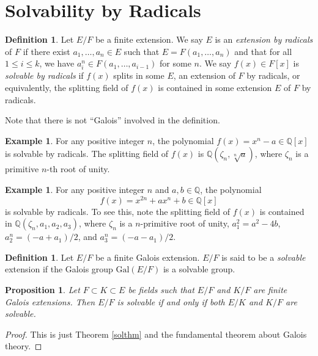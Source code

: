 \documentclass[12pt]{report}
\newtheorem{proposition}[theorem]{Proposition}
{\theoremstyle{remark}\newtheorem*{remark}{Remark}}
\theoremstyle{definition}
\newtheorem{definition}[theorem]{Definition}
\newtheorem{example}[theorem]{Example}
\newcommand{\gal}{\text{Gal}}
\newcommand{\qq}{\mathbb{Q}}
\begin{document}
\section{Solvability by Radicals}

\begin{definition}
	Let $E/F$ be a finite extension. We say $E$ is an \emph{extension by radicals} of $F$ if there exist $a_1,\dots,a_n\in E$ such that $E=F(a_1,\dots,a_n)$ and that for all $1\leq i\leq k$, we have $a_i^n\in F(a_1,\dots,a_{i-1})$ for some $n$. We say $f(x)\in F[x]$ is \emph{solvable by radicals} if $f(x)$ splits in some $E$, an extension of $F$ by radicals, or equivalently, the splitting field of $f(x)$ is contained in some extension $E$ of $F$ by radicals.
\end{definition}

Note that there is not ``Galois'' involved in the definition.

\begin{example}
	For any positive integer $n$, the polynomial $f(x)=x^n-a\in \qq[x]$ is solvable by radicals. The splitting field of $f(x)$ is $\qq(\zeta_n, \sqrt[n]{a})$, where $\zeta_n$ is a primitive $n$-th root of unity.
\end{example}

\begin{example}
	For any positive integer $n$ and $a,b\in \qq$, the polynomial $$f(x)=x^{2n}+ax^n+b\in \qq[x]$$ is solvable by radicals. To see this, note the splitting field of $f(x)$ is contained in $\qq(\zeta_n,a_1,a_2,a_3)$, where $\zeta_n$ is a $n$-primitive root of unity, $a_1^2=a^2-4b$, $a_2^n=(-a+a_1)/2$, and $a_3^n=(-a-a_1)/2$.
\end{example}

\begin{definition}
	Let $E/F$ be a finite Galois extension. $E/F$ is said to be a \emph{solvable} extension if the Galois group $\gal(E/F)$ is a solvable group.
\end{definition}

\begin{proposition}\label{subsol}
	Let $F\subset K\subset E$ be fields such that $E/F$ and $K/F$ are finite Galois extensions. Then $E/F$ is solvable if and only if both $E/K$ and $K/F$ are solvable.
\end{proposition}

\begin{proof}
	This is just Theorem \ref{solthm} and the fundamental theorem about Galois theory.
\end{proof}
\end{document}
